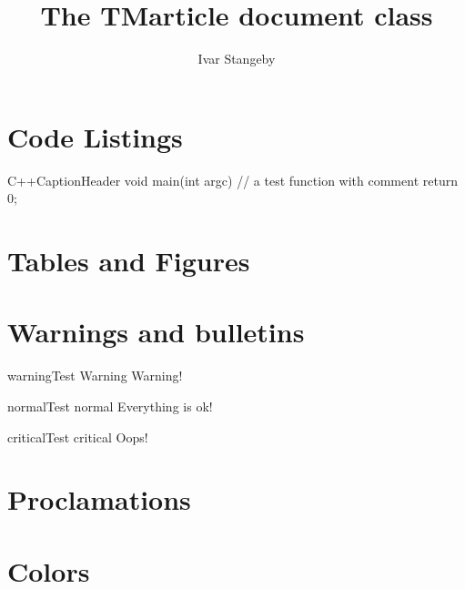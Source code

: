 \documentclass{TMarticle}
\author{Ivar Stangeby}
\title{The TMarticle document class}
\begin{document}
\maketitle
\section{Code Listings}

\begin{TMcode}{C++}{Caption}{Header}
void main(int argc) {
    // a test function with comment
    return 0;
}
\end{TMcode}

\section{Tables and Figures}

\section{Warnings and bulletins}

\begin{TMbulletin}{warning}{Test Warning}
   Warning! 
\end{TMbulletin}
\begin{TMbulletin}{normal}{Test normal}
    Everything is ok!
\end{TMbulletin}
\begin{TMbulletin}{critical}{Test critical}
    Oops!
\end{TMbulletin}

\section{Proclamations}
\section{Colors}
\end{document}

